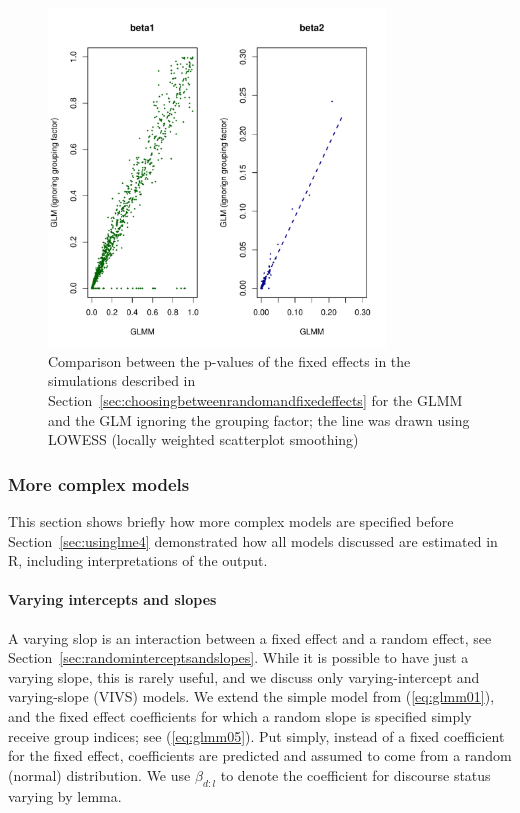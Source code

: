 \documentclass[a4paper,12pt]{article}
\begin{document}
\begin{figure}[!htpb]
  \centering
  \includegraphics[width=0.8\textwidth]{graphics/pcomparison}
  \caption{Comparison between the p-values of the fixed effects in the simulations described in Section~\ref{sec:choosingbetweenrandomandfixedeffects} for the GLMM and the GLM ignoring the grouping factor; the line was drawn using LOWESS (locally weighted scatterplot smoothing)}
  \label{fig:pcomparison}
\end{figure}

\subsubsection{More complex models}
\label{sec:morecomplexmodels}

This section shows briefly how more complex models are specified before Section~\ref{sec:usinglme4} demonstrated how all models discussed are estimated in R, including interpretations of the output.

\paragraph{Varying intercepts and slopes}

A varying slop is an interaction between a fixed effect and a random effect, see Section~\ref{sec:randominterceptsandslopes}.
While it is possible to have just a varying slope, this is rarely useful, and we discuss only varying-intercept and varying-slope (VIVS) models.
We extend the simple model from (\ref{eq:glmm01}), and the fixed effect coefficients for which a random slope is specified simply receive group indices; see (\ref{eq:glmm05}).
Put simply, instead of a fixed coefficient for the fixed effect, coefficients are predicted and assumed to come from a random (normal) distribution.
We use $\beta_{d:l}$ to denote the coefficient for discourse status varying by lemma.
\end{document}
